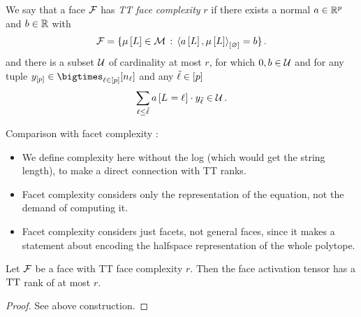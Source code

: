 \begin{definition}
    We say that a face $\mathcal{F}$ has \emph{TT face complexity} $r$ if there exists a normal $a\in\mathbb{R}^{p}$ and $b\in\mathbb{R}$ with
    \begin{align*}
        \mathcal{F} =
        \{\mu\left[L\right]\in\mathcal{M} \,:\, \left\langle a\left[L\right],\mu\left[L\right]\right\rangle_{\left[ \varnothing \right]}=b \}\, .
    \end{align*}
    and there is a subset $\mathcal{U}$ of cardinality at most $r$, for which $0,b\in\mathcal{U}$ and for any tuple $\headindexof{[\seldim]}\in\headstates$ and any $\tilde{\ell}\in[p]$
    \begin{align*}
        \sum_{\ell\leq\tilde{\ell}} a\left[L_{}=\ell_{}\right] \cdot y_{\tilde{\ell}} \in \mathcal{U} \, .
    \end{align*}
\end{definition}

Comparison with facet complexity \cite[Definition 6.2.2]{grotschel_geometric_1993}:
\begin{itemize}
    \item We define complexity here without the log (which would get the string length), to make a direct connection with TT ranks.
    \item Facet complexity considers only the representation of the equation, not the demand of computing it.
    \item Facet complexity considers just facets, not general faces, since it makes a statement about encoding the halfspace representation of the whole polytope.
\end{itemize}

\begin{theorem}
    Let $\mathcal{F}$ be a face with TT face complexity $r$.
    Then the face activation tensor has a $\mathrm{TT}$ rank of at most $r$.
\end{theorem}
\begin{proof}
    See above construction.
\end{proof}

